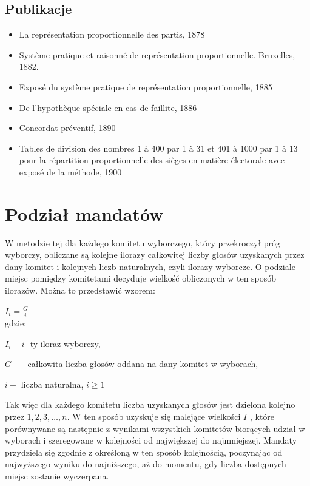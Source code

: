 \documentclass[12pt,a4paper,titlepage]{report}
\begin{document}
\subsection{Publikacje}
\begin{itemize}
\item{La représentation proportionnelle des partis, 1878}
\item{Système pratique et raisonné de représentation proportionnelle. Bruxelles, 1882.}
\item{Exposé du système pratique de représentation proportionnelle, 1885}
\item{De l'hypothèque spéciale en cas de faillite, 1886}
\item{Concordat préventif, 1890}
\item{Tables de division des nombres 1 à 400 par 1 à 31 et 401 à 1000 par 1 à 13 pour la répartition proportionnelle des sièges en matière électorale avec exposé de la méthode, 1900}
\end{itemize}
\section{Podział mandatów}
W metodzie tej dla każdego komitetu wyborczego, który przekroczył próg wyborczy, obliczane są kolejne ilorazy całkowitej liczby głosów uzyskanych przez dany komitet i kolejnych liczb naturalnych, czyli ilorazy wyborcze. O podziale miejsc pomiędzy komitetami decyduje wielkość obliczonych w ten sposób ilorazów. Można to przedstawić wzorem:

\begin{math}
I_i=\frac{G}{i}
\end{math} \\
gdzie:

\begin{math}
I_i-i
\end{math}
-ty iloraz wyborczy,

\begin{math}
G-
\end{math}
-całkowita liczba głosów oddana na dany komitet w wyborach,

\begin{math}
i-
\end{math}
liczba naturalna,
\begin{math}
i\geq{1}
\end{math}

Tak więc dla każdego komitetu liczba uzyskanych głosów jest dzielona kolejno przez 
\begin{math} 1,2,3,\dots ,n\end{math}. W ten sposób uzyskuje się malejące wielkości 
\begin{math}
I
\end{math}
, które porównywane są następnie z wynikami wszystkich komitetów biorących udział w wyborach i szeregowane w kolejności od największej do najmniejszej. Mandaty przydziela się zgodnie z określoną w ten sposób kolejnością, poczynając od najwyższego wyniku do najniższego, aż do momentu, gdy liczba dostępnych miejsc zostanie wyczerpana.
\newpage
\end{document}
